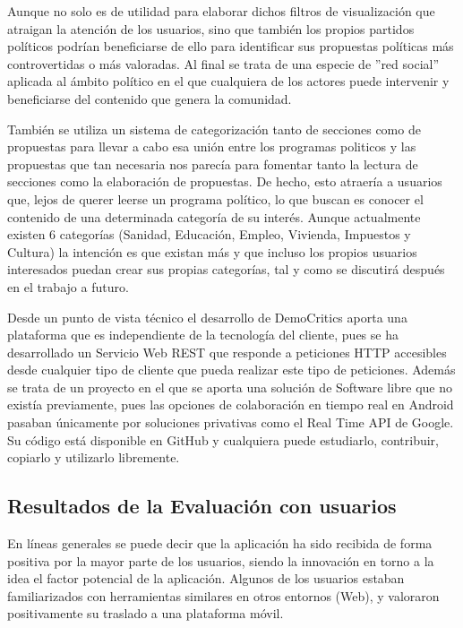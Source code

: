 Aunque no solo es de utilidad para elaborar dichos filtros de visualización que atraigan la atención de los usuarios, sino que también los propios partidos políticos podrían beneficiarse de ello para identificar sus propuestas políticas más controvertidas o más valoradas. Al final se trata de una especie de ''red social'' aplicada al ámbito político en el que cualquiera de los actores puede intervenir y beneficiarse del contenido que genera la comunidad. 

También se utiliza un sistema de categorización tanto de secciones como de propuestas para llevar a cabo esa unión entre los programas politicos y las propuestas que tan necesaria nos parecía para fomentar tanto la lectura de secciones como la elaboración de propuestas. De hecho, esto atraería a usuarios que, lejos de querer leerse un programa político, lo que buscan es conocer el contenido de una determinada categoría de su interés. Aunque actualmente existen 6 categorías (Sanidad, Educación, Empleo, Vivienda, Impuestos y Cultura) la intención es que existan más y que incluso los propios usuarios interesados puedan crear sus propias categorías, tal y como se discutirá después en el trabajo a futuro. 

Desde un punto de vista técnico el desarrollo de DemoCritics aporta una plataforma que es independiente de la tecnología del cliente, pues se ha desarrollado un Servicio Web REST que responde a peticiones HTTP accesibles desde cualquier tipo de cliente que pueda realizar este tipo de peticiones. Además se trata de un proyecto en el que se aporta una solución de Software libre que no existía previamente, pues las opciones de colaboración en tiempo real en Android pasaban únicamente por soluciones privativas como el Real Time API de Google. Su código está disponible en GitHub y cualquiera puede estudiarlo, contribuir, copiarlo y utilizarlo
libremente. 

\subsection{Resultados de la Evaluación con usuarios} \label{ssec:evaluationResults}

En líneas generales se puede decir que la aplicación ha sido recibida de forma positiva por la mayor parte de los usuarios, siendo la innovación en torno a la idea el factor potencial de la aplicación. Algunos de los usuarios estaban familiarizados con herramientas similares en otros entornos (Web), y valoraron positivamente su traslado a una plataforma móvil.


